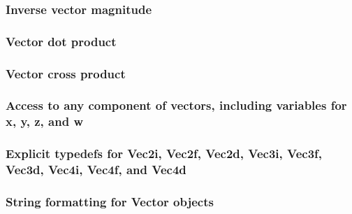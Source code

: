 \documentclass[10pt,a4paper]{report}
\begin{document}
			\subsubsection{Inverse vector magnitude}
			\subsubsection{Vector dot product}
			\subsubsection{Vector cross product}
			\subsubsection{Access to any component of vectors, including variables for x, y, z, and w}
			\subsubsection{Explicit typedefs for Vec2i, Vec2f, Vec2d, Vec3i, Vec3f, Vec3d, Vec4i, Vec4f, and Vec4d}
			\subsubsection{String formatting for Vector objects}
\end{document}

